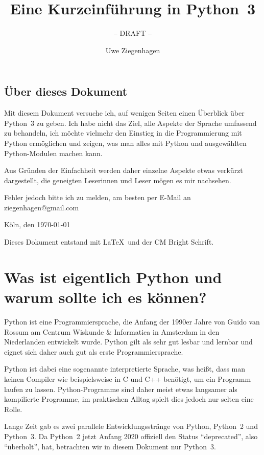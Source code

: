 \documentclass[12pt,ngerman]{scrreprt}
\title{Eine Kurzeinführung in Python~3}
\subtitle{-- DRAFT --}
\author{Uwe Ziegenhagen}
\begin{document}
\maketitle

\tableofcontents

\listoffigures

\listoftables

\clearpage

\section*{Über dieses Dokument}

Mit diesem Dokument versuche ich, auf wenigen Seiten einen Überblick über Python~3 zu geben. Ich habe nicht das Ziel, alle Aspekte der Sprache umfassend zu behandeln, ich möchte vielmehr den Einstieg in die Programmierung mit Python ermöglichen und zeigen, was man alles mit Python und ausgewählten Python-Modulen machen kann. 

Aus Gründen der Einfachheit werden daher einzelne Aspekte etwas verkürzt dargestellt, die geneigten Leserinnen und Leser mögen es mir nachsehen. 

Fehler jedoch bitte ich zu melden, am besten per E-Mail an ziegenhagen@gmail.com


\vspace*{3em}Köln, den \today

\vfill Dieses Dokument entstand mit \LaTeX\ und der CM Bright Schrift.

\chapter{Was ist eigentlich Python und warum sollte ich es können?}

Python ist eine Programmiersprache, die Anfang der 1990er Jahre von Guido van Rossum am Centrum Wiskunde \& Informatica in Amsterdam in den Niederlanden entwickelt wurde. Python gilt als sehr gut lesbar und lernbar und eignet sich daher auch gut als erste Programmiersprache. 

Python ist dabei eine sogenannte interpretierte Sprache, was heißt, dass man keinen Compiler wie beispielsweise in C und C++ benötigt, um ein Programm laufen zu lassen. Python-Programme sind daher meist etwas langsamer als kompilierte Programme, im praktischen Alltag spielt dies jedoch nur selten eine Rolle.

Lange Zeit gab es zwei parallele Entwicklungsstränge von Python, Python~2 und Python~3. Da Python~2 jetzt Anfang 2020 offiziell den Status \enquote{deprecated}, also  \enquote{überholt}, hat, betrachten wir in diesem Dokument nur Python~3.
\end{document}
